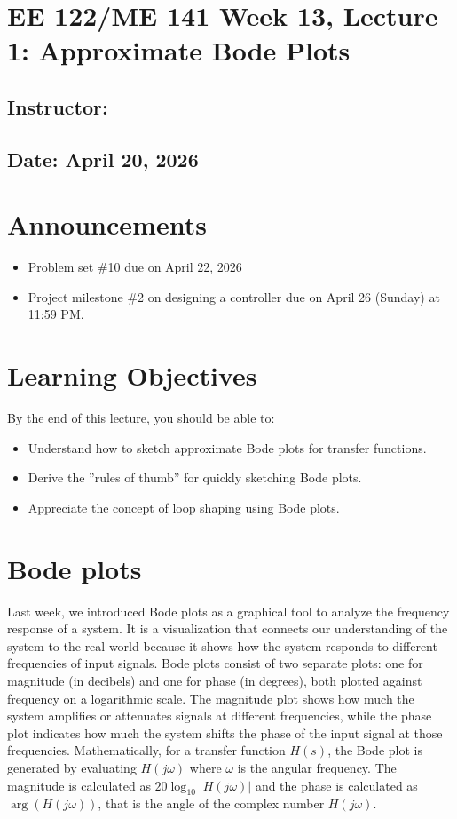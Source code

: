 \documentclass{ee122_notes}
\renewcommand{\releasedate}{April 20, 2026}
\begin{document}
\section*{EE 122/ME 141 Week 13, Lecture 1: Approximate Bode Plots}
\subsection*{Instructor: \instructor}
\subsection*{Date: \releasedate}
\section{Announcements}
\begin{itemize}
    \item Problem set \#10 due on April 22, 2026 
    \item Project milestone \#2 on designing a controller due on April 26 (Sunday) at 11:59 PM.
\end{itemize}
\section{Learning Objectives}
By the end of this lecture, you should be able to:
\begin{itemize}
    \item Understand how to sketch approximate Bode plots for transfer functions.
    \item Derive the ''rules of thumb'' for quickly sketching Bode plots.
    \item Appreciate the concept of loop shaping using Bode plots.
\end{itemize}

\section{Bode plots}
Last week, we introduced Bode plots as a graphical tool to analyze the frequency response of a system. It is a visualization that connects our understanding of the system to the real-world because it shows how the system responds to different frequencies of input signals. Bode plots consist of two separate plots: one for magnitude (in decibels) and one for phase (in degrees), both plotted against frequency on a logarithmic scale. The magnitude plot shows how much the system amplifies or attenuates signals at different frequencies, while the phase plot indicates how much the system shifts the phase of the input signal at those frequencies. Mathematically, for a transfer function \( H(s) \), the Bode plot is generated by evaluating \( H(j\omega) \) where \( \omega \) is the angular frequency. The magnitude is calculated as \( 20 \log_{10} |H(j\omega)| \) and the phase is calculated as \( \arg(H(j\omega)) \), that is the angle of the complex number \( H(j\omega) \). 
\end{document}
